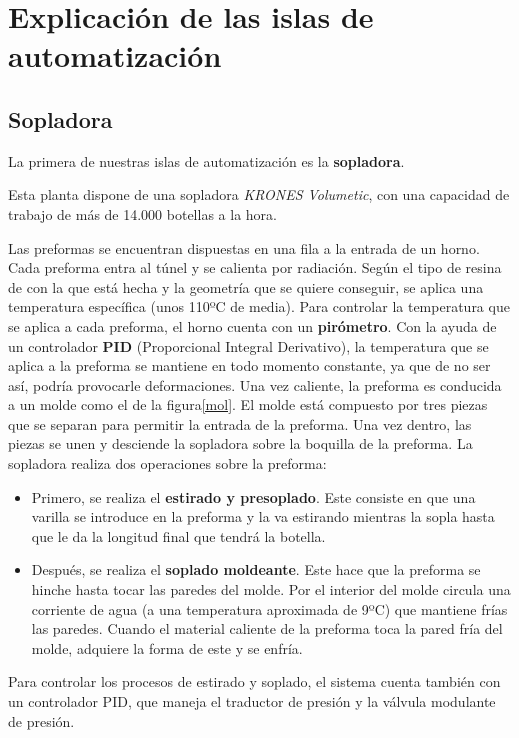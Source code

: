 \documentclass[11pt,a4paper,spanish,twoside]{report}
\begin{document}
\chapter{Explicación de las islas de automatización}
\section{Sopladora}
La primera de nuestras islas de automatización es la \textbf{sopladora}.

Esta planta dispone de una sopladora \emph{KRONES Volumetic}, con una 
capacidad de trabajo de más de 14.000 botellas a la hora.

Las preformas se encuentran dispuestas en una fila a la entrada de un horno. 
Cada preforma entra al túnel y se calienta por radiación. Según el tipo de 
resina de con la que está hecha y la geometría que se quiere conseguir, se 
aplica una temperatura específica (unos 110ºC de media). Para controlar la 
temperatura que se aplica a cada preforma, el horno cuenta con un 
\textbf{pirómetro}. Con la ayuda de un controlador \textbf{PID} (Proporcional
Integral Derivativo), la temperatura que se aplica a la preforma se mantiene
en todo momento constante, ya que de no ser así, podría provocarle
deformaciones.
Una vez caliente, la preforma es conducida a un molde como el de la
figura\ref{mol}. El molde está compuesto por tres piezas que se separan
para permitir la entrada de la preforma. Una vez dentro, las piezas se unen y
desciende la sopladora sobre la boquilla de la preforma. La sopladora realiza
dos operaciones sobre la preforma: 
\begin{itemize}
\item Primero, se realiza el \textbf{estirado y presoplado}. Este consiste en
que una varilla se introduce en la preforma y la va estirando mientras la 
sopla hasta que le da la longitud final que tendrá la botella.
\item Después, se realiza el \textbf{soplado moldeante}. Este hace que la 
preforma se hinche hasta tocar las paredes del molde. Por el interior del
molde circula una corriente de agua (a una temperatura aproximada de 9ºC) que
mantiene frías las paredes. Cuando el material caliente de la preforma toca la
pared fría del molde, adquiere la forma de este y se enfría.
\end{itemize}
Para controlar los procesos de estirado y soplado, el sistema cuenta también 
con un controlador PID, que maneja el traductor de presión y la válvula 
modulante de presión.
\end{document}
